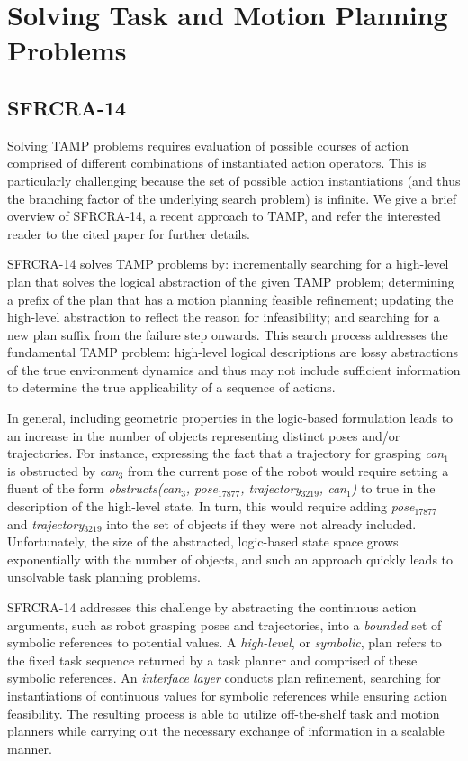 \section{Solving Task and Motion Planning Problems}
\subsection{SFRCRA-14}
Solving TAMP problems requires evaluation of
possible courses of action comprised of different combinations of
instantiated action operators. This is particularly challenging
because the set of possible action instantiations (and thus the
branching factor of the underlying search problem) is infinite.
We give a brief overview of SFRCRA-14, a recent approach to TAMP, and
refer the interested reader to the cited paper for further details.

SFRCRA-14 solves TAMP problems by: incrementally
searching for a high-level plan that solves the logical abstraction
of the given TAMP problem; determining a prefix of the plan that has a
motion planning feasible refinement; updating the high-level
abstraction to reflect the reason for infeasibility; and searching for
a new plan suffix from the failure step onwards. This search process
addresses the fundamental TAMP problem: high-level
logical descriptions are lossy abstractions of the true environment
dynamics and thus may not include sufficient information to
determine the true applicability of a sequence of actions.

In general, including geometric properties in the logic-based formulation leads to an
increase in the number of objects representing distinct poses and/or trajectories. For
instance, expressing the fact that a trajectory for grasping \emph{can$_1$} is obstructed by
\emph{can$_3$} from the current pose of the robot would require setting a fluent of the
form \emph{obstructs(can$_3$, pose$_{17877}$, trajectory$_{3219}$, can$_1$)} to true in
the description of the high-level state. In turn, this would require adding
\emph{pose$_{17877}$} and \emph{trajectory$_{3219}$} into the set of objects if they were
not already included. Unfortunately, the size of the abstracted, logic-based state space
grows exponentially with the number of objects, and such an approach quickly leads to
unsolvable task planning problems.

SFRCRA-14 addresses this challenge by abstracting the continuous
action arguments, such as robot grasping poses and trajectories, into
a \emph{bounded} set of symbolic references to potential values. A
\emph{high-level}, or \emph{symbolic}, plan refers to the fixed task
sequence returned by a task planner and comprised of these symbolic
references. An \emph{interface layer} conducts plan refinement,
searching for instantiations of continuous values for symbolic
references while ensuring action feasibility.  The resulting process
is able to utilize off-the-shelf task and motion planners while
carrying out the necessary exchange of information in a scalable
manner.


